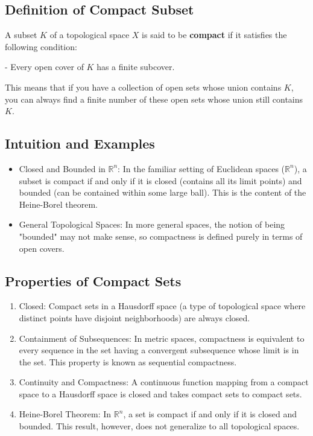 \documentclass[a4paper,12pt]{article} %
\begin{document}
\subsection{Definition of Compact Subset}

A subset \( K \) of a topological space \( X \) is said to be \textbf{compact} if it satisfies the following condition:

- Every open cover of \( K \) has a finite subcover.

This means that if you have a collection of open sets whose union contains \( K \), you can always find a finite number of these open sets whose union still contains \( K \). 

\subsection{Intuition and Examples}
\begin{itemize}
   \item Closed and Bounded in \(\mathbb{R}^n\): In the familiar setting of Euclidean spaces (\(\mathbb{R}^n\)), a subset is compact if and only if it is closed (contains all its limit points) and bounded (can be contained within some large ball). This is the content of the Heine-Borel theorem.
   \item General Topological Spaces: In more general spaces, the notion of being "bounded" may not make sense, so compactness is defined purely in terms of open covers.
\end{itemize}

\subsection{Properties of Compact Sets}
\begin{enumerate}
   \item Closed: Compact sets in a Hausdorff space (a type of topological space where distinct points have disjoint neighborhoods) are always closed.
   \item Containment of Subsequences: In metric spaces, compactness is equivalent to every sequence in the set having a convergent subsequence whose limit is in the set. This property is known as sequential compactness.
   \item Continuity and Compactness: A continuous function mapping from a compact space to a Hausdorff space is closed and takes compact sets to compact sets.
   \item Heine-Borel Theorem: In \(\mathbb{R}^n\), a set is compact if and only if it is closed and bounded. This result, however, does not generalize to all topological spaces.
\end{enumerate}
\end{document}
